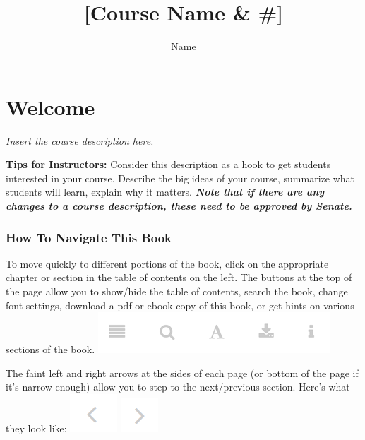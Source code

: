 \documentclass[
]{book}
\title{{[}Course Name \& \#{]}}
\author{Name}
\date{}
\begin{document}
\maketitle

{
\setcounter{tocdepth}{1}
\tableofcontents
}
\hypertarget{welcome}{%
\chapter*{Welcome}\label{welcome}}

\emph{Insert the course description here.}

\begin{feedback}
\textbf{Tips for Instructors:}
Consider this description as a hook to get students interested in your course. Describe the big ideas of your course, summarize what students will learn, explain why it matters.
\textbf{\emph{Note that if there are any changes to a course description, these need to be approved by Senate.}}
\end{feedback}

\hypertarget{how-to-navigate-this-book}{%
\subsection*{How To Navigate This Book}\label{how-to-navigate-this-book}}

To move quickly to different portions of the book, click on the appropriate chapter or section in the table of contents on the left. The buttons at the top of the page allow you to show/hide the table of contents, search the book, change font settings, download a pdf or ebook copy of this book, or get hints on various sections of the book.
\includegraphics{assets/course-intro/menu.png}

The faint left and right arrows at the sides of each page (or bottom of the page if it's narrow enough) allow you to step to the next/previous section. Here's what they look like:
\includegraphics{assets/course-intro/left_arrow.png} \includegraphics{assets/course-intro/right_arrow.png}
\end{document}
